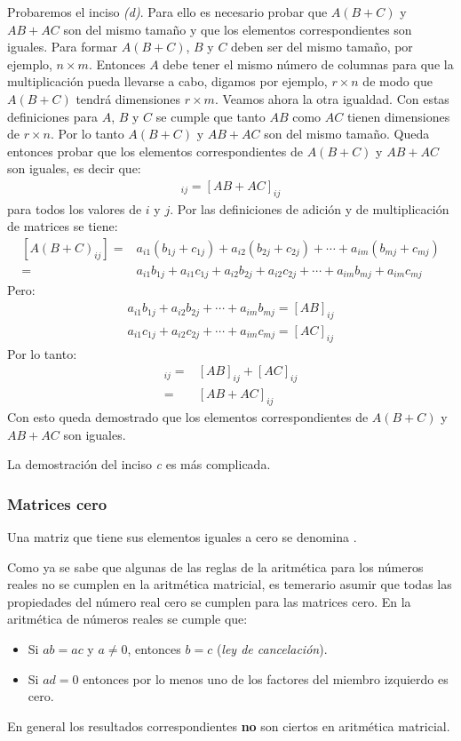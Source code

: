 \documentclass[a4paper,12pt]{article}
\begin{document}
\demo Probaremos el inciso \emph{(d)}. Para ello es necesario probar que
$A(B+C)$ y $AB+AC$ son del mismo tamaño y que los elementos correspondientes
son iguales. Para formar $A(B+C)$, $B$ y $C$ deben ser del mismo tamaño, por
ejemplo, $n\times m$. Entonces $A$ debe tener el mismo número de columnas para
que la multiplicación pueda llevarse a cabo, digamos por ejemplo, $r\times n$
de modo que $A(B+C)$ tendrá dimensiones $r\times m$. Veamos ahora la otra
igualdad. Con estas definiciones para $A$, $B$ y $C$ se cumple que tanto
$AB$ como $AC$ tienen dimensiones de $r\times n$. Por lo tanto $A(B+C)$ y
$AB+AC$ son del mismo tamaño.
Queda entonces probar que los elementos correspondientes de $A(B+C)$ y $AB+AC$
son iguales, es decir que:
\begin{align*}
  [A(B+C)]_{ij}=[AB+AC]_{ij}
\end{align*}
para todos los valores de $i$ y $j$. Por las definiciones de adición y de
multiplicación de matrices se tiene:
\begin{align*}
  \left[ A(B+C)_{ij}
  \right]=&a_{i1}(b_{1j}+c_{1j})+a_{i2}(b_{2j}+c_{2j})+\cdots+a_{im}(b_{mj}+c_{mj}) \\
         =&a_{i1}b_{1j}+a_{i1}c_{1j}+a_{i2}b_{2j}+a_{i2}c_{2j}+\cdots+a_{im}b_{mj}+a_{im}c_{mj}
\end{align*}
Pero:
\begin{align*}
  a_{i1}b_{1j}+a_{i2}b_{2j}+\cdots+a_{im}b_{mj}=[AB]_{ij} \\
  a_{i1}c_{1j}+a_{i2}c_{2j}+\cdots+a_{im}c_{mj}=[AC]_{ij}
\end{align*}
Por lo tanto:
\begin{align*}
  [A(B+C)]_{ij}=&[AB]_{ij}+[AC]_{ij} \\
               =&[AB+AC]_{ij}
\end{align*}
Con esto queda demostrado que los elementos correspondientes de $A(B+C)$ y
$AB+AC$ son iguales.

La demostración del inciso \emph{c} es más complicada.

\subsubsection{Matrices cero}

\begin{concept}
  Una matriz que tiene sus elementos iguales a cero se denomina .
\end{concept}

Como ya se sabe que algunas de las reglas de la aritmética para los números reales
no se cumplen en la aritmética matricial, es temerario asumir que todas las
propiedades del número real cero se cumplen para las matrices cero. En la
aritmética de números reales se cumple que:
\begin{itemize}
  \item Si $ab=ac$ y $a\ne 0$, entonces $b=c$ (\emph{ley de cancelación}).
  \item Si $ad=0$ entonces por lo menos uno de los factores del miembro
    izquierdo es cero.
\end{itemize}
En general los resultados correspondientes \textbf{no} son ciertos en aritmética
matricial.
\end{document}
